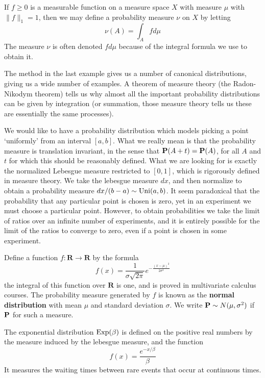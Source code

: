 \begin{example}
    If $f \geq 0$ is a measurable function on a measure space $X$ with measure $\mu$ with $\| f \|_1 = 1$, then we may define a probability measure $\nu$ on $X$ by letting
    \[ \nu(A) = \int_A f d\mu \]
    The measure $\nu$ is often denoted $f d\mu$ because of the integral formula we use to obtain it.
\end{example}

The method in the last example gives us a number of canonical distributions, giving us a wide number of examples. A theorem of measure theory (the Radon-Nikodym theorem) tells us why almost all the important probability distributions can be given by integration (or summation, those measure theory tells us these are essentially the same processes).

\begin{example}
    We would like to have a probability distribution which models picking a point `uniformly' from an interval $[a,b]$. What we really mean is that the probability measure is translation invariant, in the sense that $\operatorname{\mathbf{P}}(A + t) = \operatorname{\mathbf{P}}(A)$, for all $A$ and $t$ for which this should be reasonably defined. What we are looking for is exactly the normalized Lebesgue measure restricted to $[0,1]$, which is rigorously defined in measure theory. We take the lebesgue measure $dx$, and then normalize to obtain a probability measure $dx/(b-a) \sim \operatorname{\text{Uni}}(a,b)$. It seem paradoxical that the probability that any particular point is chosen is zero, yet in an experiment we must choose a particular point. However, to obtain probabilities we take the limit of ratios over an infinite number of experiments, and it is entirely possible for the limit of the ratios to converge to zero, even if a point is chosen in some experiment.
\end{example}

\begin{example}
    Define a function $f:\mathbf{R} \to \mathbf{R}$ by the formula
    \[ f(x) = \frac{1}{\sigma \sqrt{2\pi}} e^{-\frac{(x - \mu)^2}{2\sigma^2}} \]
    the integral of this function over $\mathbf{R}$ is one, and is proved in multivariate calculus courses. The probability measure generated by $f$ is known as the {\bf normal distribution} with mean $\mu$ and standard deviation $\sigma$. We write $\operatorname{\mathbf{P}} \sim N(\mu, \sigma^2)$ if $\operatorname{\mathbf{P}}$ for such a measure.
\end{example}

\begin{example}
    The exponential distribution $\operatorname{\text{Exp}}(\beta)$ is defined on the positive real numbers by the measure induced by the lebesgue measure, and the function
    \[ f(x) = \frac{e^{-x/\beta}}{\beta} \]
    It measures the waiting times between rare events that occur at continuous times.
\end{example}

